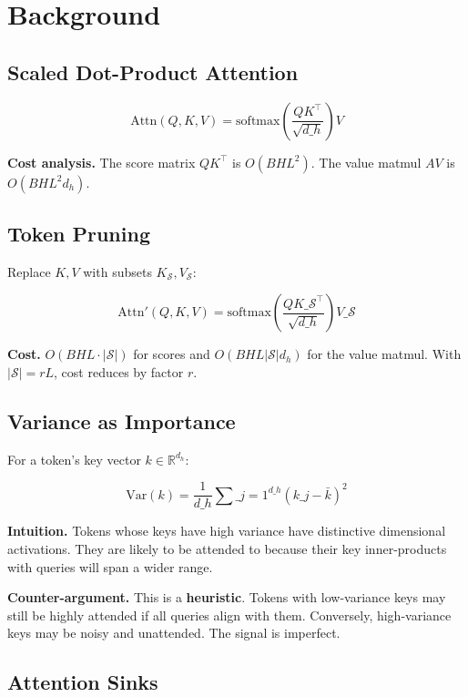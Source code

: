 
\section{Background}

\subsection{Scaled Dot-Product Attention}

\[
\text{Attn}(Q, K, V) = \text{softmax}\!\left(\frac{QK^\top}{\sqrt{d\_h}}\right)V
\tag{3.1}
\]

\textbf{Cost analysis.} The score matrix $QK^\top$ is $O(B H L^2)$. The value 
matmul $AV$ is $O(B H L^2 d_h)$.

\subsection{Token Pruning}

Replace $K, V$ with subsets $K_{\mathcal{S}}, V_{\mathcal{S}}$:

\[
\text{Attn}'(Q, K, V) = \text{softmax}\!\left(\frac{QK\_{\mathcal{S}}^\top}{\sqrt{d\_h}}\right)V\_{\mathcal{S}}
\tag{3.2}
\]

\textbf{Cost.} $O(B H L \cdot |\mathcal{S}|)$ for scores and $O(B H L |\mathcal{S}| d_h)$ 
for the value matmul. With $|\mathcal{S}| = rL$, cost reduces by factor $r$.

\subsection{Variance as Importance}

For a token's key vector $k \in \mathbb{R}^{d_h}$:

\[
\text{Var}(k) = \frac{1}{d\_h} \sum\_{j=1}^{d\_h} (k\_j - \bar{k})^2
\tag{3.3}
\]

\textbf{Intuition.} Tokens whose keys have high variance have distinctive 
dimensional activations. They are likely to be attended to because their 
key inner-products with queries will span a wider range.

\textbf{Counter-argument.} This is a \textbf{heuristic}. Tokens with low-variance 
keys may still be highly attended if all queries align with them. Conversely, 
high-variance keys may be noisy and unattended. The signal is imperfect.

\subsection{Attention Sinks}

